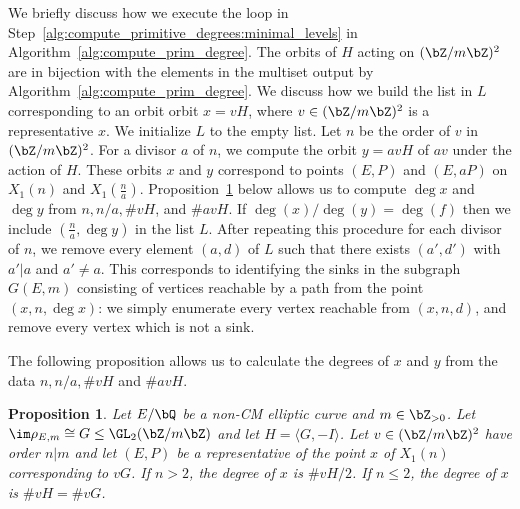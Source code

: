 \documentclass[11pt,reqno]{amsart}
\theoremstyle{plain}
\newtheorem{proposition}[theorem]{Proposition}
\theoremstyle{definition}
\newcommand{\Q}{\bQ}
\newcommand{\Z}{\bZ}
\begin{document}
We briefly discuss how we execute the loop in Step~\ref{alg:compute_primitive_degrees:minimal_levels} in Algorithm~\ref{alg:compute_prim_degree}. The orbits of $H$ acting on $(\Z/m\Z)^2$ are in bijection with the elements in the multiset output by Algorithm~\ref{alg:compute_prim_degree}. We discuss how we build the list in $L$ corresponding to an orbit orbit $x=vH$, where $v\in (\Z/m\Z)^2$ is a representative $x$. We initialize $L$ to the empty list. Let $n$ be the order of $v$ in $(\Z/m\Z)^2$. For a divisor $a$ of $n$, we compute the orbit $y=avH$ of $av$ under the action of $H$. These orbits $x$ and $y$ correspond to points $(E,P)$ and $(E,aP)$ on $X_1(n)$ and $X_1(\frac{n}{a})$. Proposition~\ref{prop:compute_degrees} below allows us to compute $\deg x$ and $\deg y$ from $n,n/a,\#vH$, and $\#avH$.  If  $\deg(x)/\deg(y)=\deg(f)$ then we include $( \frac{n}{a},\deg y)$  in the list $L$. 
After repeating this procedure for each divisor of $n$,  we remove every element $( a,d)$ of $L$ such that there exists $( a',d') $ with $a'|a$ and $a'\not=a$. This corresponds to identifying the 
sinks in the subgraph $G(E,m)$ consisting of vertices reachable by a path from the point $(x,n,\deg x)$: we simply enumerate every vertex reachable from $(x,n,d)$, and remove every vertex which is not a sink. 

The following proposition allows us to calculate the degrees of $x$ and $y$ from the data $n,n/a,\#vH$ and $\#avH$. 

\begin{proposition}\label{prop:compute_degrees}
Let $E/\Q$ be a non-CM elliptic curve and $m \in \Z_{>0}$. Let $\im \rho_{E,m} \cong G \leq \GL_2(\Z/m\Z)$ and let $H=\langle G,-I\rangle$. Let $v\in (\Z/m\Z)^2$ have order $n|m$ and let $(E,P)$ be a representative of the point $x$ of $X_1(n)$  corresponding to $vG$. If $n>2$, the degree of $x$ is $\#vH/2$. If $n\leq 2$, the degree of $x$ is 
$\#vH=\#vG$. 
\end{proposition}
\end{document}
